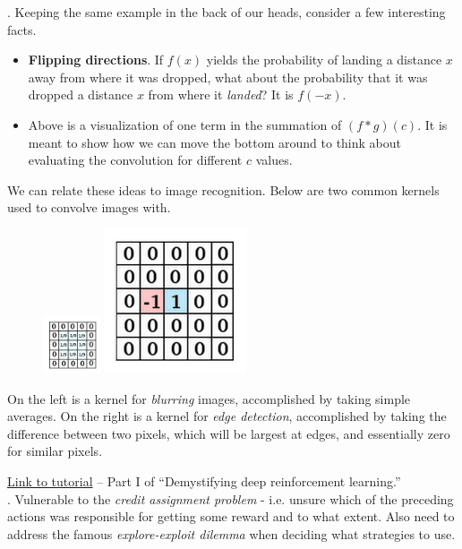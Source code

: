 \documentclass[11pt]{article}
\begin{document}
\myspace
\p {}. Keeping the same example in the back of our heads, consider a few interesting facts. 
\begin{itemize}
	\item \textbf{Flipping directions}. If $f(x)$ yields the probability of landing a distance $x$ away from where it was dropped, what about the probability that it was dropped a distance $x$ from where it \textit{landed}? It is $f(-x)$. 
	
	
	\item Above is a visualization of one term in the summation of $(f * g)(c)$. It is meant to show how we can move the bottom around to think about evaluating the convolution for different $c$ values. 
\end{itemize}
We can relate these ideas to image recognition. Below are two common kernels used to convolve images with. 
\begin{figure}[h!]
	\centering
	\includegraphics[width=0.15\textwidth]{figs/ColahKernel1.PNG}
	\hspace{2.5cm}
	\includegraphics[height=0.15\textwidth]{figs/ColahKernel2.PNG}
\end{figure}

On the left is a kernel for \textit{blurring} images, accomplished by taking simple averages. On the right is a kernel for \textit{edge detection}, accomplished by taking the difference between two pixels, which will be largest at edges, and essentially zero for similar pixels.



\href{https://www.nervanasys.com/demystifying-deep-reinforcement-learning/}{Link to tutorial} -- Part I of ``Demystifying deep reinforcement learning.'' \\


\p {}. Vulnerable to the \textit{credit assignment problem} - i.e. unsure which of the preceding actions was responsible for getting some reward and to what extent. Also need to address the famous \textit{explore-exploit dilemma} when deciding what strategies to use. 
\end{document}
